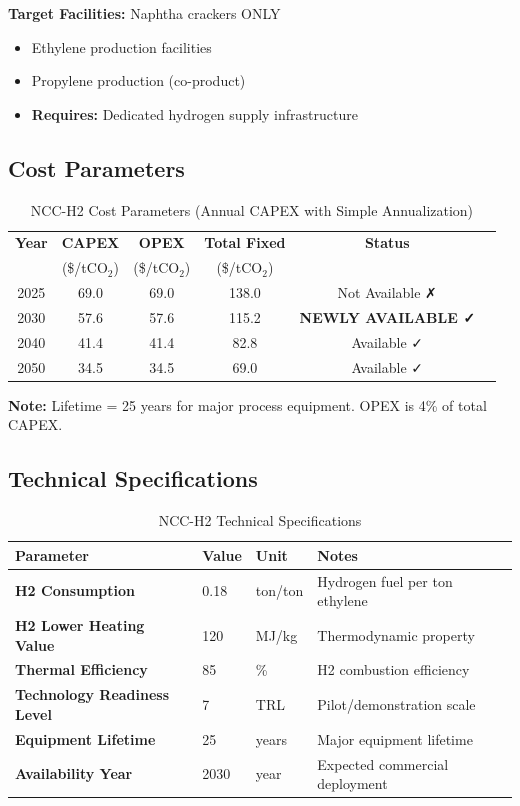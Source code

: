 \documentclass[11pt,a4paper]{report}
\newcommand{\tco}{tCO$_2$}
\begin{document}
\textbf{Target Facilities:} Naphtha crackers ONLY
\begin{itemize}[leftmargin=*]
    \item Ethylene production facilities
    \item Propylene production (co-product)
    \item \textbf{Requires:} Dedicated hydrogen supply infrastructure
\end{itemize}

\subsection{Cost Parameters}

\begin{table}[H]
\centering
\caption{NCC-H2 Cost Parameters (Annual CAPEX with Simple Annualization)}
\begin{tabular}{cccccc}
\toprule
\textbf{Year} & \textbf{CAPEX} & \textbf{OPEX} & \textbf{Total Fixed} & \textbf{Status} \\
 & (\$/\tco) & (\$/\tco) & (\$/\tco) & \\
\midrule
2025 & 69.0 & 69.0 & 138.0 & Not Available ✗ \\
\rowcolor{lightgray}
2030 & 57.6 & 57.6 & 115.2 & \textbf{NEWLY AVAILABLE ✓} \\
2040 & 41.4 & 41.4 & 82.8 & Available ✓ \\
2050 & 34.5 & 34.5 & 69.0 & Available ✓ \\
\bottomrule
\end{tabular}
\label{tab:ncch2-costs}
\end{table}

\textbf{Note:} Lifetime = 25 years for major process equipment. OPEX is 4\% of total CAPEX.

\subsection{Technical Specifications}

\begin{table}[H]
\centering
\caption{NCC-H2 Technical Specifications}
\begin{tabular}{p{6cm}p{3cm}p{2cm}p{4cm}}
\toprule
\textbf{Parameter} & \textbf{Value} & \textbf{Unit} & \textbf{Notes} \\
\midrule
\textbf{H2 Consumption} & 0.18 & ton/ton & Hydrogen fuel per ton ethylene \\
\textbf{H2 Lower Heating Value} & 120 & MJ/kg & Thermodynamic property \\
\textbf{Thermal Efficiency} & 85 & \% & H2 combustion efficiency \\
\textbf{Technology Readiness Level} & 7 & TRL & Pilot/demonstration scale \\
\textbf{Equipment Lifetime} & 25 & years & Major equipment lifetime \\
\textbf{Availability Year} & 2030 & year & Expected commercial deployment \\
\bottomrule
\end{tabular}
\label{tab:ncch2-specs}
\end{table}
\end{document}
